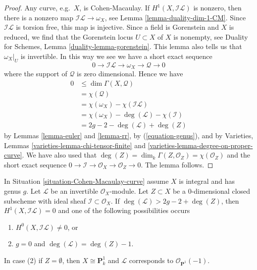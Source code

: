 \begin{proof}
Any curve, e.g.\ $X$, is Cohen-Macaulay.
If $H^1(X, \mathcal{I}\mathcal{L})$ is nonzero, then there is a nonzero
map $\mathcal{I}\mathcal{L} \to \omega_X$, see
Lemma \ref{lemma-duality-dim-1-CM}.
Since $\mathcal{I}\mathcal{L}$ is torsion free, this map is injective.
Since a field is Gorenstein and $X$ is reduced, we find
that the Gorenstein locus $U \subset X$ of $X$ is nonempty, see
Duality for Schemes, Lemma \ref{duality-lemma-gorenstein}.
This lemma also tells us that $\omega_X|_U$ is invertible.
In this way we see we have a short exact sequence
$$
0 \to \mathcal{I}\mathcal{L} \to \omega_X \to \mathcal{Q} \to 0
$$
where the support of $\mathcal{Q}$ is zero dimensional.
Hence we have
\begin{align*}
0 & \leq \dim \Gamma(X, \mathcal{Q})\\
& =
\chi(\mathcal{Q}) \\
& =
\chi(\omega_X) - \chi(\mathcal{I}\mathcal{L}) \\
& =
\chi(\omega_X) - \deg(\mathcal{L}) - \chi(\mathcal{I}) \\
& =
2g - 2 - \deg(\mathcal{L}) + \deg(Z)
\end{align*}
by Lemmas \ref{lemma-euler} and \ref{lemma-rr}, by (\ref{equation-genus}),
and by Varieties, Lemmas \ref{varieties-lemma-chi-tensor-finite}
and \ref{varieties-lemma-degree-on-proper-curve}. We have also used
that $\deg(Z) = \dim_k \Gamma(Z, \mathcal{O}_Z) = \chi(\mathcal{O}_Z)$
and the short exact sequence
$0 \to \mathcal{I} \to \mathcal{O}_X \to \mathcal{O}_Z \to 0$.
The lemma follows.
\end{proof}

\begin{lemma}
\label{lemma-degree-more-than-2g-2}
\begin{reference}
\cite[Lemma 2]{Jongmin}
\end{reference}
In Situation \ref{situation-Cohen-Macaulay-curve}
assume $X$ is integral and has genus $g$.
Let $\mathcal{L}$ be an invertible $\mathcal{O}_X$-module.
Let $Z \subset X$ be a $0$-dimensional closed subscheme with ideal
sheaf $\mathcal{I} \subset \mathcal{O}_X$.
If $\deg(\mathcal{L}) > 2g - 2 + \deg(Z)$, then
$H^1(X, \mathcal{I}\mathcal{L}) = 0$ and one of the following possibilities
occurs
\begin{enumerate}
\item $H^0(X, \mathcal{I}\mathcal{L}) \not = 0$, or
\item $g = 0$ and $\deg(\mathcal{L}) = \deg(Z) - 1$.
\end{enumerate}
In case (2) if $Z = \emptyset$, then $X \cong \mathbf{P}^1_k$ and $\mathcal{L}$
corresponds to $\mathcal{O}_{\mathbf{P}^1}(-1)$.
\end{lemma}

